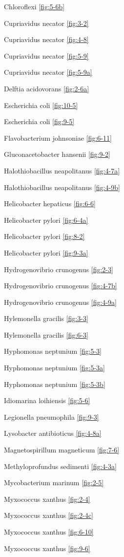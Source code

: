 \documentclass[]{tufte-book}
\begin{document}
Chloroflexi \ref{fig:5-6b}

Cupriavidus necator \ref{fig:3-2}

Cupriavidus necator \ref{fig:4-8}

Cupriavidus necator \ref{fig:5-9}

Cupriavidus necator \ref{fig:5-9a}

Delftia acidovorans \ref{fig:2-6a}

Escherichia coli \ref{fig:10-5}

Escherichia coli \ref{fig:9-5}

Flavobacterium johnsoniae \ref{fig:6-11}

Gluconacetobacter hansenii \ref{fig:9-2}

Halothiobacillus neapolitanus \ref{fig:4-7a}

Halothiobacillus neapolitanus \ref{fig:4-9b}

Helicobacter hepaticus \ref{fig:6-6}

Helicobacter pylori \ref{fig:6-4a}

Helicobacter pylori \ref{fig:8-2}

Helicobacter pylori \ref{fig:9-3a}

Hydrogenovibrio crunogenus \ref{fig:2-3}

Hydrogenovibrio crunogenus \ref{fig:4-7b}

Hydrogenovibrio crunogenus \ref{fig:4-9a}

Hylemonella gracilis \ref{fig:3-3}

Hylemonella gracilis \ref{fig:6-3}

Hyphomonas neptunium \ref{fig:5-3}

Hyphomonas neptunium \ref{fig:5-3a}

Hyphomonas neptunium \ref{fig:5-3b}

Idiomarina loihiensis \ref{fig:5-6}

Legionella pneumophila \ref{fig:9-3}

Lysobacter antibioticus \ref{fig:4-8a}

Magnetospirillum magneticum \ref{fig:7-6}

Methyloprofundus sedimenti \ref{fig:4-3a}

Mycobacterium marinum \ref{fig:2-5}

Myxococcus xanthus \ref{fig:2-4}

Myxococcus xanthus \ref{fig:2-4c}

Myxococcus xanthus \ref{fig:6-10}

Myxococcus xanthus \ref{fig:9-6}
\end{document}
